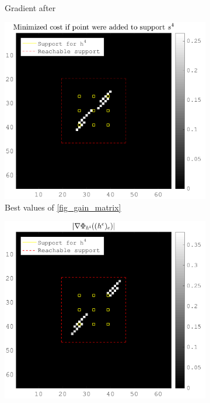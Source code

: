 \begin{figure}[!ht]
\begin{subfigure}[b]{0.32\textwidth}
\caption{Gradient after} \label{fig_grad_after}
\end{subfigure}
\begin{subfigure}[b]{0.32\textwidth}\centering
\includegraphics[width=\textwidth]{figures/before_after/xp_128x128_sc2_angl1_K3_S3_node4before_objmatrix_bestvalues.png}
\caption{Best values of \ref{fig_gain_matrix}}
\end{subfigure}
\begin{subfigure}[b]{0.32\textwidth}\centering
\includegraphics[width=\textwidth]{figures/before_after/xp_128x128_sc2_angl1_K3_S3_node4before_partgrad4_bestvalues.png}

\end{subfigure}
\end{figure}
